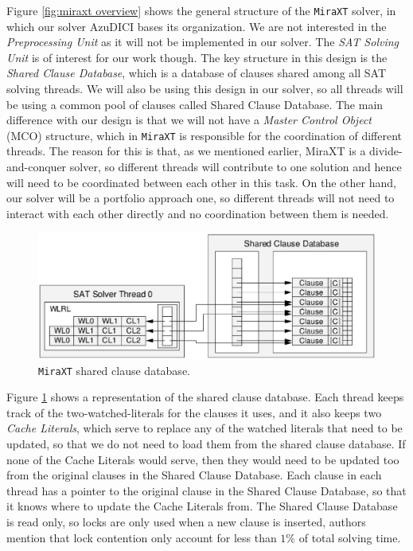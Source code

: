 \documentclass[12pt]{diicc}
\begin{document}
Figure \ref{fig:miraxt overview} shows the general structure of the \texttt{MiraXT} solver, in which our solver AzuDICI bases its organization. We are not interested in the \textit{Preprocessing Unit} as it will not be implemented in our solver. The \textit{SAT Solving Unit} is of interest for our work though. The key structure in this design is the \textit{Shared Clause Database}, which is a database of clauses shared among all SAT solving threads. We will also be using this design in our solver, so all threads will be using a common pool of clauses called Shared Clause Database. The main difference with our design is that we will not have a \textit{Master Control Object} (MCO) structure, which in \texttt{MiraXT} is responsible for the coordination of different threads. The reason for this is that, as we mentioned earlier, MiraXT is a divide-and-conquer solver, so different threads will contribute to one solution and hence will need to be coordinated between each other in this task. On the other hand, our solver will be a portfolio approach one, so different threads will not need to interact with each other directly and no coordination between them is needed.

\begin{figure}[h!]
	\centering
		\includegraphics[scale=0.6]{miraxtdatabase}
	\caption{\texttt{MiraXT} shared clause database.}
	\label{fig:miraxt database}
\end{figure}

Figure \ref{fig:miraxt database} shows a representation of the shared clause database. Each thread keeps track of the two-watched-literals for the clauses it uses, and it also keeps two \textit{Cache Literals}, which serve to replace any of the watched literals that need to be updated, so that we do not need to load them from the shared clause database. If none of the Cache Literals would serve, then they would need to be updated too from the original clauses in the Shared Clause Database. Each clause in each thread has a pointer to the original clause in the Shared Clause Database, so that it knows where to update the Cache Literals from. The Shared Clause Database is read only, so locks are only used when a new clause is inserted, authors mention that lock contention only account for less than $1\%$ of total solving time.
\end{document}

